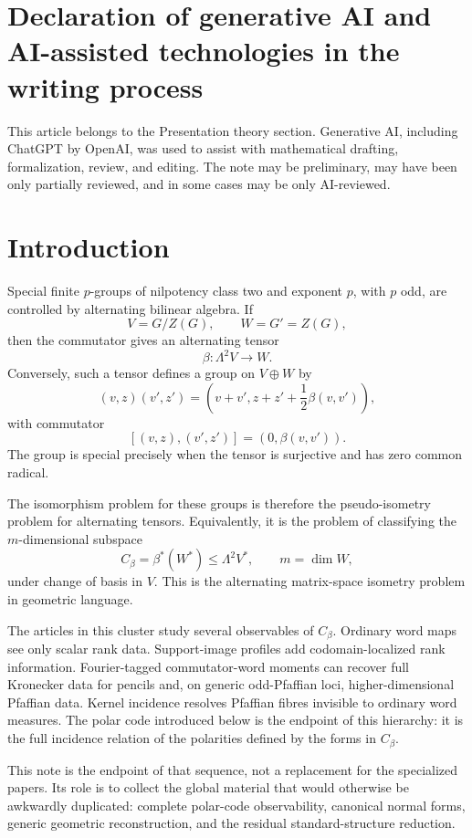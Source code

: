 \documentclass[11pt]{article}
\begin{document}
\section*{Declaration of generative AI and AI-assisted technologies in the writing process}
This article belongs to the Presentation theory section. Generative AI, including ChatGPT by \mbox{OpenAI}, was used to assist with mathematical drafting, formalization, review, and editing. The note may be preliminary, may have been only partially reviewed, and in some cases may be only AI-reviewed.

\section{Introduction}

Special finite $p$-groups of nilpotency class two and exponent $p$, with $p$ odd, are controlled by alternating bilinear algebra. If
\[
V=G/Z(G),
\qquad
W=G'=Z(G),
\]
then the commutator gives an alternating tensor
\[
\beta:\Lambda^2V\to W.
\]
Conversely, such a tensor defines a group on $V\oplus W$ by
\[
(v,z)(v',z')
=
\left(v+v',z+z'+\frac12\beta(v,v')\right),
\]
with commutator
\[
[(v,z),(v',z')]=(0,\beta(v,v')).
\]
The group is special precisely when the tensor is surjective and has zero common radical.

The isomorphism problem for these groups is therefore the pseudo-isometry problem for alternating tensors. Equivalently, it is the problem of classifying the $m$-dimensional subspace
\[
C_\beta=\beta^*(W^*)\le \Lambda^2V^*,
\qquad m=\dim W,
\]
under change of basis in $V$. This is the alternating matrix-space isometry problem in geometric language.

The articles in this cluster study several observables of $C_\beta$. Ordinary word maps see only scalar rank data. Support-image profiles add codomain-localized rank information. Fourier-tagged commutator-word moments can recover full Kronecker data for pencils and, on generic odd-Pfaffian loci, higher-dimensional Pfaffian data. Kernel incidence resolves Pfaffian fibres invisible to ordinary word measures. The polar code introduced below is the endpoint of this hierarchy: it is the full incidence relation of the polarities defined by the forms in $C_\beta$.

This note is the endpoint of that sequence, not a replacement for the specialized papers. Its role is to collect the global material that would otherwise be awkwardly duplicated: complete polar-code observability, canonical normal forms, generic geometric reconstruction, and the residual standard-structure reduction.
\end{document}

